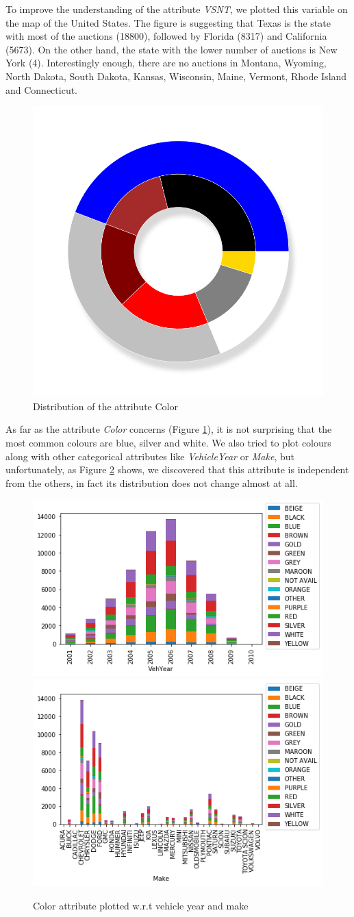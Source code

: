 \documentclass{article}
\begin{document}
	To improve the understanding of the attribute \emph{VSNT}, we plotted this variable on the map of the United States. The figure is suggesting that Texas is the state with most of the auctions (18800), followed by Florida (8317) and California (5673). On the other hand, the state with the lower number of auctions is New York (4). Interestingly enough, there are no auctions in Montana, Wyoming, North Dakota, South Dakota, Kansas, Wisconsin, Maine, Vermont, Rhode Island and Connecticut.
	
	\begin{figure}[H]
		\centering
		\includegraphics[width=.3\textwidth]{color.png}
		\caption{Distribution of the attribute Color}
		\label{fig:color}
	\end{figure}
	
	
	As far as the attribute \emph{Color}  concerns (Figure \ref{fig:color}), it is not surprising that the most common colours are blue, silver and white. We also tried to plot colours along with other categorical attributes like \emph{VehicleYear} or \emph{Make}, but unfortunately, as Figure \ref{fig:colorwrt} shows, we discovered that this attribute is independent from the others, in fact its distribution does not change almost at all.
	
	
	\begin{figure}[]
		\centering
		\includegraphics[width=.5\textwidth, keepaspectratio]{barcoloryear.png}\hspace{1cm}
		\includegraphics[width=.42\textwidth, keepaspectratio]{barcolormake.png}
		\caption{Color attribute plotted w.r.t vehicle year and make}
		\label{fig:colorwrt}
	\end{figure}
	
\end{document}
